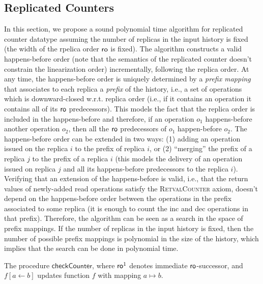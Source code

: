 \subsection{Replicated Counters}
\label{sec:counter}

In this section, we propose a sound polynomial time algorithm for replicated counter datatype assuming the number of replicas in the input history is fixed (\ie the width of the rpelica order $\mathsf{ro}$ is fixed). The algorithm constructs a valid happens-before order (note that the semantics of the replicated counter doesn't constrain the linearization order) incrementally, following the replica order. At any time, the happens-before order is uniquely determined by a \emph{prefix mapping} that associates to each replica a \emph{prefix} of the history, i.e., a set of operations which is downward-closed w.r.t. replica order (i.e., if it contains an operation it contains all of its $\mathsf{ro}$ predecessors). This models the fact that the replica order is included in the happens-before and therefore, if an operation $o_1$ happens-before another operation $o_2$, then all the $\mathsf{ro}$ predecessors of $o_1$ happen-before $o_2$. The happens-before order can be extended in two ways: (1) adding an operation issued on the replica $i$ to the prefix of replica $i$, or (2) ``merging'' the prefix of a replica $j$ to the prefix of a replica $i$ (this models the delivery of an operation issued on replica $j$ and all its happens-before predecessors to the replica $i$). Verifying that an extension of the happens-before is valid, i.e., that the return values of newly-added {\sf read} operations satisfy the \textsc{RetvalCounter} axiom, doesn't depend on the happens-before order between the operations in the prefix associated to some replica (it is enough to count the {\sf inc} and {\sf dec} operations in that prefix). Therefore, the algorithm can be seen as a search in the space of prefix mappings. If the number of replicas in the input history is fixed, then the number of possible prefix mappings is polynomial in the size of the history, which implies that the search can be done in polynomial time.

\begin{algorithm}[t]
  {\footnotesize}
  \caption{The procedure $\mathsf{checkCounter}$, where $\mathsf{ro}^1$ denotes immediate $\mathsf{ro}$-successor, and $f[a\leftarrow b]$ updates function $f$ with mapping $a \mapsto b$.}
  \label{countercrdtalgo:main}
\end{algorithm}


